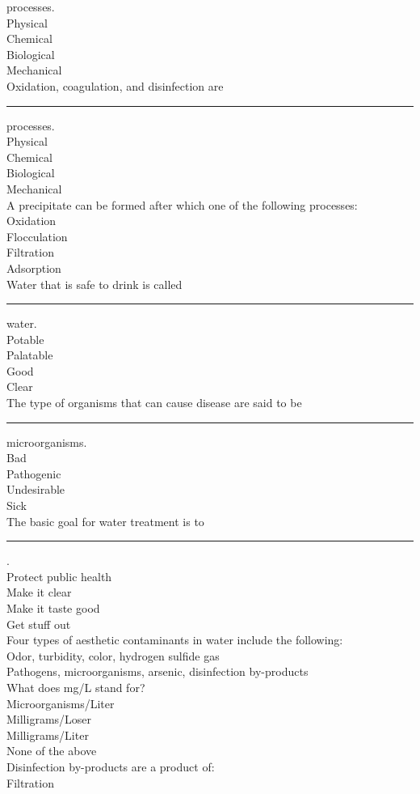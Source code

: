 processes.\\
Physical\\
Chemical\\
Biological\\
Mechanical\\
Oxidation, coagulation, and disinfection are \rule{2cm}{0.3pt} processes.\\
Physical\\
Chemical\\
Biological\\
Mechanical\\
A precipitate can be formed after which one of the following processes:\\
Oxidation\\
Flocculation\\
Filtration\\
Adsorption\\
Water that is safe to drink is called \rule{1cm}{0.5pt}  water.\\
Potable\\
Palatable\\
Good\\
Clear\\
The type of organisms that can cause disease are said to be \rule{1cm}{0.5pt} microorganisms.\\
Bad\\
Pathogenic\\
Undesirable\\
Sick\\
The basic goal for water treatment is to \rule{1cm}{0.5pt}.\\
Protect public health\\
Make it clear\\
Make it taste good\\
Get stuff out\\
Four types of aesthetic contaminants in water include the following:\\
Odor, turbidity, color, hydrogen sulfide gas\\
Pathogens, microorganisms, arsenic, disinfection by-products\\
What does mg/L stand for?\\
Microorganisms/Liter\\
Milligrams/Loser\\
Milligrams/Liter\\
None of the above\\
Disinfection by-products are a product of:\\
Filtration\\
